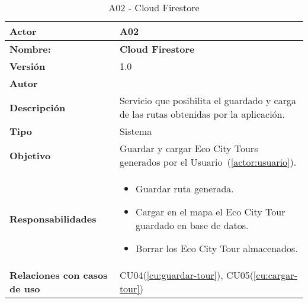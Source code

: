 \begin{table}[H]
	\centering
	\begin{tabularx}{\linewidth}{ p{} p{} }
		\toprule
		\textbf{Actor}    & A02 \\
		\toprule
		\textbf{Nombre:} 			  & \textbf{Cloud Firestore} \\
		\textbf{Versión}              & 1.0    \\
		\textbf{Autor}                & \autor \\
		\textbf{Descripción}          & Servicio que posibilita el guardado y carga de las rutas obtenidas por la aplicación. \\
		\textbf{Tipo}                 & Sistema \\
		\textbf{Objetivo}             & Guardar y cargar Eco City Tours generados por el Usuario~(\ref{actor:usuario}). \\
		\textbf{Responsabilidades}    & 
		\begin{itemize}
			\tightlist
			\item Guardar ruta generada.
			\item Cargar en el mapa el Eco City Tour guardado en base de datos.
			\item Borrar los Eco City Tour almacenados.
		\end{itemize}\\
		\textbf{Relaciones con casos de uso} & CU04(\ref{cu:guardar-tour}), CU05(\ref{cu:cargar-tour}) \\
		\bottomrule
	\end{tabularx}
	\caption{A02 - Cloud Firestore}
	\label{actor:firestore}
\end{table}


